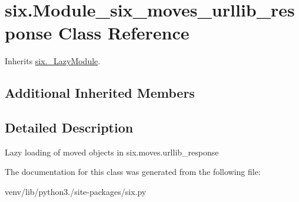 \hypertarget{classsix_1_1_module__six__moves__urllib__response}{}\section{six.\+Module\+\_\+six\+\_\+moves\+\_\+urllib\+\_\+response Class Reference}
\label{classsix_1_1_module__six__moves__urllib__response}


Inherits \hyperlink{classsix_1_1___lazy_module}{six.\+\_\+\+Lazy\+Module}.

\subsection*{Additional Inherited Members}


\subsection{Detailed Description}
\begin{DoxyVerb}Lazy loading of moved objects in six.moves.urllib_response\end{DoxyVerb}
 

The documentation for this class was generated from the following file\+:\begin{DoxyCompactItemize}
\item 
venv/lib/python3./site-\/packages/six.\+py\end{DoxyCompactItemize}
